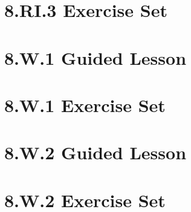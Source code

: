 \documentclass[a4paper,12pt]{article}
\begin{document}
\newpage
\section{8.RI.3 Exercise Set}


\newpage
\section{8.W.1 Guided Lesson}


\newpage
\section{8.W.1 Exercise Set}


\newpage
\section{8.W.2 Guided Lesson}


\newpage
\section{8.W.2 Exercise Set}

\end{document}

